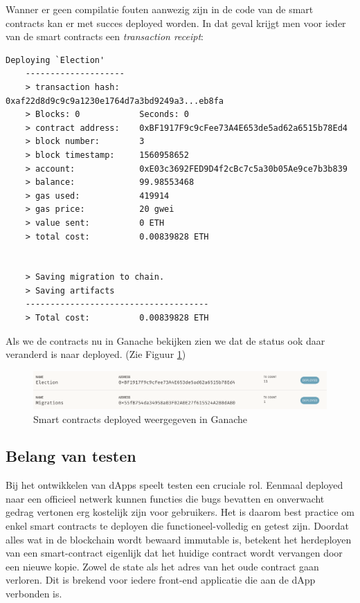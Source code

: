 	Wanner er geen compilatie fouten aanwezig zijn in de code van de smart contracts kan er met succes deployed worden. In dat geval krijgt men voor ieder van de smart contracts een \textit{transaction receipt}:
	\lstset{language=bash}
	\begin{lstlisting}[numbers=none]
	 Deploying `Election'
	--------------------
	> transaction hash:    0xaf22d8d9c9c9a1230e1764d7a3bd9249a3...eb8fa
	> Blocks: 0            Seconds: 0
	> contract address:    0xBF1917F9c9cFee73A4E653de5ad62a6515b78Ed4
	> block number:        3
	> block timestamp:     1560958652
	> account:             0xE03c3692FED9D4f2cBc7c5a30b05Ae9ce7b3b839
	> balance:             99.98553468
	> gas used:            419914
	> gas price:           20 gwei
	> value sent:          0 ETH
	> total cost:          0.00839828 ETH
	
	
	> Saving migration to chain.
	> Saving artifacts
	-------------------------------------
	> Total cost:          0.00839828 ETH
	\end{lstlisting}
	
	Als we de contracts nu in Ganache bekijken zien we dat de status ook daar veranderd is naar deployed. (Zie Figuur \ref{fig:contracts-ganache2})
	
	\begin{figure}
		\includegraphics[width=\linewidth]{img/contracts-ganache2.png}
		\caption{Smart contracts deployed weergegeven in Ganache}
		\label{fig:contracts-ganache2}
	\end{figure}
	
	\subsection{Belang van testen}
	Bij het ontwikkelen van dApps speelt testen een cruciale rol. Eenmaal deployed naar een officieel netwerk kunnen functies die bugs bevatten en onverwacht gedrag vertonen erg kostelijk zijn voor gebruikers. Het is daarom best practice om enkel smart contracts te deployen die functioneel-volledig en getest zijn.  Doordat alles wat in de blockchain wordt bewaard immutable is, betekent het herdeployen van een smart-contract eigenlijk dat het huidige contract wordt vervangen door een nieuwe kopie. Zowel de state als het adres van het oude contract gaan verloren. Dit is brekend voor iedere front-end applicatie die aan de dApp verbonden is. 
	
